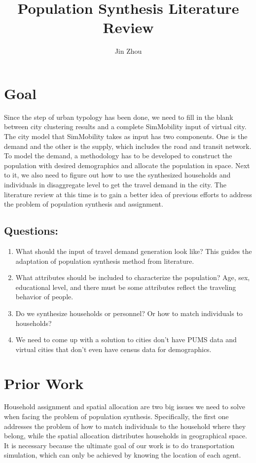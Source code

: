 \documentclass{article}
\begin{document}
\title{Population Synthesis Literature Review}
\author{Jin Zhou}
\maketitle


\section{Goal}
Since the step of urban typology has been done, we need to fill in the blank between city clustering results and a complete SimMobility\cite{adnan2016simmobility} input of virtual city.
The city model that SimMobility takes as input has two components.
One is the demand and the other is the supply, which includes the road and transit network.
To model the demand, a methodology has to be developed to construct the population with desired demographics and allocate the population in space.
Next to it, we also need to figure out how to use the synthesized households and individuals in disaggregate level to get the travel demand in the city.
The literature review at this time is to gain a better idea of previous efforts to address the problem of population synthesis and assignment. 

\subsection{Questions:}
\begin{enumerate}
	\item What should the input of travel demand generation look like? This guides the adaptation of population synthesis method from literature.
	\item What attributes should be included to characterize the population? Age, sex, educational level, and there must be some attributes reflect the traveling behavior of people. 
	\item Do we synthesize households or personnel? Or how to match individuals to households?
	\item We need to come up with a solution to cities don't have PUMS data and virtual cities that don't even have census data for demographics.	
\end{enumerate}


\section{Prior Work}

Household assignment and spatial allocation are two big issues we need to solve when facing the problem of population synthesis.
Specifically, the first one addresses the problem of how to match individuals to the household where they belong, while the spatial allocation distributes households in geographical space.
It is necessary because the ultimate goal of our work is to do transportation simulation, which can only be achieved by knowing the location of each agent. \\
\end{document}
